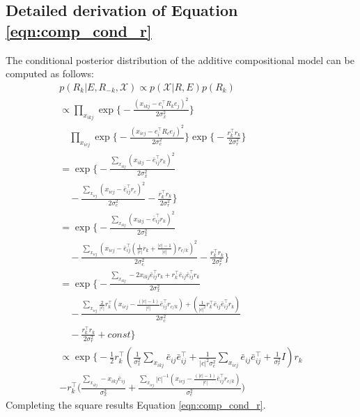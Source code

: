 \subsection*{Detailed derivation of Equation \ref{eqn:comp_cond_r}}
The conditional posterior distribution of the additive compositional model can be computed as follows:
\begin{align*}
&p(R_k | E, R_{-k}, \mathcal{X}) \propto p(\mathcal{X} | R, E)p(R_k)&\\
&\propto \prod_{x_{ikj}}\exp\bigg\{-\frac{(x_{ikj} - e_i^\top R_k e_j)^2}{2\sigma_x^2}\bigg\} &\\
& \quad\prod_{x_{icj}} \exp\bigg\{-\frac{(x_{icj} - e_i^\top R_c e_j)^2}{2\sigma_c^2}\bigg\} \exp\bigg\{-\frac{r_k^\top r_k}{2\sigma_r^2}\bigg\}&\\
&= \exp\bigg\{-\frac{\sum_{x_{ikj}}(x_{ikj} - \bar{e}_{ij}^\top r_k)^2}{2\sigma_x^2} &\\
&\quad- \frac{\sum_{x_{icj}}(x_{icj} - \bar{e}_{ij}^\top r_c)^2}{2\sigma_c^2} -\frac{r_k^\top r_k}{2\sigma_r^2} \bigg\}&\\
&= \exp\bigg\{-\frac{\sum_{x_{ikj}}(x_{ikj} - \bar{e}_{ij}^\top r_k)^2}{2\sigma_x^2} &\\ 
&\quad-\frac{\sum_{x_{icj}}(x_{icj} - \bar{e}_{ij}^\top (\frac{1}{|c|}r_k + \frac{|c|-1}{|c|})r_{c/k})^2}{2\sigma_c^2} -\frac{r_k^\top r_k}{2\sigma_r^2} \bigg\}&\\
&= \exp\bigg\{ -\frac{\sum_{x_{ikj}}- 2 x_{ikj} \bar{e}_{ij}^\top r_k + r_k^\top \bar{e}_{ij} \bar{e}_{ij}^\top r_k }{2\sigma_x^2} &\\
&\quad-\frac{\sum_{x_{icj}} \frac{2}{|c|} r_k ^\top (x_{icj} - \frac{(|c|-1)}{|c|} \bar{e}_{ij}^\top r_{c/k}) + (\frac{1}{|c|^2}r_k^\top \bar{e}_{ij} \bar{e}_{ij}^\top r_k)}{2\sigma_c^2} &\\
&\quad-\frac{r_k^\top r_k}{2\sigma_r^2} + const \bigg\}&\\
&\propto \exp\bigg\{ - \frac{1}{2}r_k^\top(\frac{1}{\sigma_x^2}\sum_{x_{ikj}} \bar{e}_{ij}\bar{e}_{ij}^\top + \frac{1}{|c|^2\sigma_c^2}\sum_{x_{icj}} \bar{e}_{ij}\bar{e}_{ij}^\top + \frac{1}{\sigma_r^2}I) r_k  &\\
&- r_k^\top \Big(\frac{\sum_{x_{ikj}}-x_{ikj}\bar{e}_{ij}}{\sigma_x^2} + \frac{\sum_{x_{icj}} |c|^{-1} (x_{icj} - \frac{(|c|-1)}{|c|} \bar{e}_{ij}^\top r_{c/k})}{\sigma_c^2} \Big)&
\end{align*}
Completing the square results Equation \ref{eqn:comp_cond_r}.


